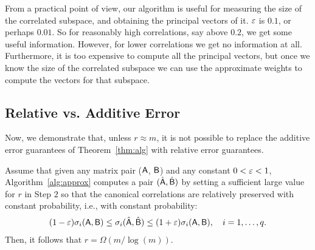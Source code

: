 
From a practical point of view, our algorithm is useful
for measuring the size of the correlated subspace, and obtaining
the principal vectors of it. $\varepsilon$ is $0.1$, or perhaps $0.01$. So for reasonably high correlations,
say above $0.2$, we get some useful information. However, for lower correlations we
get no information at all. Furthermore, it is too expensive to compute
all the principal vectors, but once we know the size of the correlated subspace
we can use the approximate weights to compute the vectors for that subspace.

\subsection{Relative vs. Additive Error}\label{sec:error:lowerbound}
Now, we demonstrate that, unless $r \approx m$, it is not possible to replace the additive error guarantees of Theorem~\ref{thm:alg} with relative error guarantees.
%
\begin{lemma}
Assume that given any matrix pair (${\mathsf{A} }$, ${\mathsf{B} }$) and any constant $0<\varepsilon <1$, Algorithm~\ref{alg:approx} computes a pair $(\hat{{\mathsf{A} }}, \hat{{\mathsf{B} }})$ by setting a sufficient large value for $r$ in Step $2$ so that the canonical correlations are relatively preserved with constant probability, i.e., with constant probability:
\begin{align*}
	(1-\varepsilon) \sigma_i({\mathsf{A} },{\mathsf{B} }) \leq \sigma_i(\hat{{\mathsf{A} }},\hat{{\mathsf{B} }}) \leq (1+\varepsilon) \sigma_i({\mathsf{A} },{\mathsf{B} }), \quad i=1,\ldots ,q.
\end{align*}
Then, it follows that $r = \Omega( m/\log(m))$.
\end{lemma}
%
%
